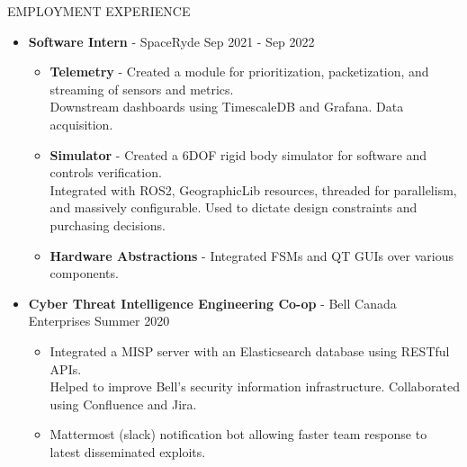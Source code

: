 \documentclass{resume} %
\begin{document}
\begin{rSection}{EMPLOYMENT EXPERIENCE}
    \begin{itemize}
        \item {\bf Software Intern} - SpaceRyde \hfill {Sep 2021 - Sep 2022}
        \begin{itemize}[topsep=-10pt]
            \setlength\itemsep{-0.35em}
            \item[\textbullet] {\bf Telemetry} - Created a module for prioritization, packetization, and streaming of sensors and metrics.\\
            Downstream dashboards using TimescaleDB and Grafana. Data acquisition.
            \item[\textbullet] {\bf Simulator} - Created a 6DOF rigid body simulator for software and controls verification.\\
            Integrated with ROS2, GeographicLib resources, threaded for parallelism, and massively configurable.
            Used to dictate design constraints and purchasing decisions.
            \item[\textbullet] {\bf Hardware Abstractions} - Integrated FSMs and QT GUIs over various components.
        \end{itemize}
        \item {\bf Cyber Threat Intelligence Engineering Co-op} - Bell Canada Enterprises \hfill {Summer 2020}
        \begin{itemize}[topsep=-10pt]
            \setlength\itemsep{-0.35em}
            \item[\textbullet] Integrated a MISP server with an Elasticsearch database using RESTful APIs.\\
            Helped to improve Bell's security information infrastructure. Collaborated using Confluence and Jira.
            \item[\textbullet] Mattermost (slack) notification bot allowing faster team response to latest disseminated exploits.
        \end{itemize}
    \end{itemize}
\end{rSection}
\end{document}
